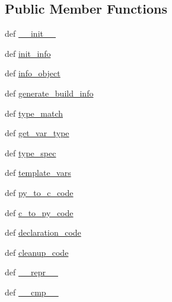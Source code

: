 \subsection*{Public Member Functions}
\begin{DoxyCompactItemize}
\item 
def \hyperlink{classscipy_1_1weave_1_1c__spec_1_1common__base__converter_a5f8a0cd5ae41726d37c8c92d5368ad06}{\+\_\+\+\_\+init\+\_\+\+\_\+}
\item 
def \hyperlink{classscipy_1_1weave_1_1c__spec_1_1common__base__converter_a6ca7d91c20ec0202a7f94ea6972a022c}{init\+\_\+info}
\item 
def \hyperlink{classscipy_1_1weave_1_1c__spec_1_1common__base__converter_ab4715551d0cfa96b677fe33220a4acb8}{info\+\_\+object}
\item 
def \hyperlink{classscipy_1_1weave_1_1c__spec_1_1common__base__converter_ac0ed457d582622720f8a300b38a80902}{generate\+\_\+build\+\_\+info}
\item 
def \hyperlink{classscipy_1_1weave_1_1c__spec_1_1common__base__converter_ab9b579b974a8c44496beee7aa3801ea1}{type\+\_\+match}
\item 
def \hyperlink{classscipy_1_1weave_1_1c__spec_1_1common__base__converter_ab994d55abf7c4f4762a4a550719716f7}{get\+\_\+var\+\_\+type}
\item 
def \hyperlink{classscipy_1_1weave_1_1c__spec_1_1common__base__converter_a6da537be054bfb58e4469846afab0878}{type\+\_\+spec}
\item 
def \hyperlink{classscipy_1_1weave_1_1c__spec_1_1common__base__converter_a136abcbaaddc2c4f68da068b97031a5e}{template\+\_\+vars}
\item 
def \hyperlink{classscipy_1_1weave_1_1c__spec_1_1common__base__converter_aa74e344159503f5579f967e4ed884b63}{py\+\_\+to\+\_\+c\+\_\+code}
\item 
def \hyperlink{classscipy_1_1weave_1_1c__spec_1_1common__base__converter_a4ab36640480854eb0c9ff141f829a0d3}{c\+\_\+to\+\_\+py\+\_\+code}
\item 
def \hyperlink{classscipy_1_1weave_1_1c__spec_1_1common__base__converter_aaefcb180e9e906d5a9322fc7340e62f7}{declaration\+\_\+code}
\item 
def \hyperlink{classscipy_1_1weave_1_1c__spec_1_1common__base__converter_a4feafc40f21182cd260034505c32b5df}{cleanup\+\_\+code}
\item 
def \hyperlink{classscipy_1_1weave_1_1c__spec_1_1common__base__converter_adab79db343c3929f6593f53fef10f8ba}{\+\_\+\+\_\+repr\+\_\+\+\_\+}
\item 
def \hyperlink{classscipy_1_1weave_1_1c__spec_1_1common__base__converter_a570e25ebce561efb9b80360be6b99a12}{\+\_\+\+\_\+cmp\+\_\+\+\_\+}
\end{DoxyCompactItemize}
